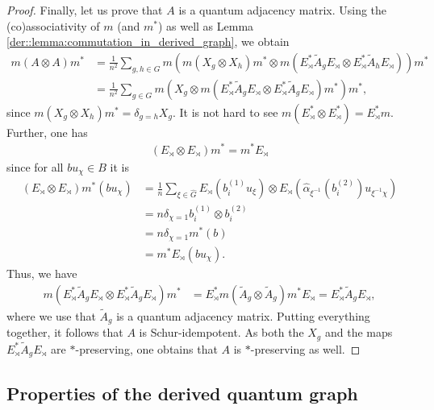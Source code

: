 \documentclass{amsart}
\theoremstyle{definition}
\theoremstyle{definition}
\begin{document}
\begin{proof}
    Finally, let us prove that $A$ is a quantum adjacency matrix. Using the (co)associativity of $m$ (and $m^\ast$) as well as Lemma \ref{der::lemma:commutation_in_derived_graph}, we obtain
    \begin{align*}
        m(A \otimes A) m^\ast
            &= \frac{1}{n^2} \sum_{g, h \in G} m(m(X_g \otimes X_h)m^\ast \otimes m(E_\rtimes^\ast \tilde{A}_g E_\rtimes \otimes E_\rtimes^\ast \tilde{A}_h E_\rtimes)) m^\ast \\
            &= \frac{1}{n^2} \sum_{g\in G} m(X_g \otimes m(E_\rtimes^\ast \tilde{A}_g E_\rtimes \otimes E_\rtimes^\ast \tilde{A}_g E_\rtimes) m^\ast)m^\ast,
    \end{align*}
    since $m(X_g \otimes X_h) m^\ast = \delta_{g=h} X_g$. It is not hard to see $m(E_\rtimes^\ast \otimes E_\rtimes^\ast) = E_\rtimes^\ast m$. Further, one has
    \begin{align*}
        (E_\rtimes \otimes E_\rtimes) m^\ast = m^\ast E_\rtimes
    \end{align*}
    since for all $b u_\chi \in B$ it is
    \begin{align*}
        (E_\rtimes \otimes E_\rtimes) m^\ast(b u_\chi)
            &= \frac{1}{n} \sum_{\xi \in \hat{G}} E_\rtimes(b_i^{(1)} u_\xi) \otimes E_\rtimes(\hat{\alpha}_{\xi^{-1}}(b_i^{(2)}) u_{\xi^{-1} \chi}) \\
            &= n \delta_{\chi = 1} b_i^{(1)} \otimes b_i^{(2)}  \\
            &= n \delta_{\chi = 1} m^\ast(b) \\
            &= m^\ast E_\rtimes(b u_\chi).
    \end{align*}
    Thus, we have
    \begin{align*}
        m(E_\rtimes^\ast \tilde{A}_g E_\rtimes \otimes E_\rtimes^\ast \tilde{A}_g E_\rtimes) m^\ast
            &= E_\rtimes^\ast m(\tilde{A}_g \otimes \tilde{A}_g) m^\ast E_\rtimes
            = E_\rtimes^\ast \tilde{A}_g E_\rtimes,
    \end{align*}
    where we use that $\tilde{A}_g$ is a quantum adjacency matrix. Putting everything together, it follows that $A$ is Schur-idempotent. As both the $X_g$ and the maps $E_\rtimes^\ast \tilde{A}_g E_\rtimes$ are $\ast$-preserving, one obtains that $A$ is $\ast$-preserving as well.
\end{proof}


\subsection{Properties of the derived quantum graph}
\end{document}
